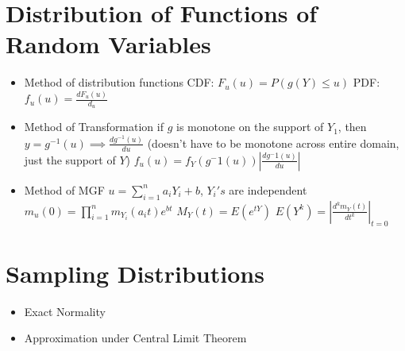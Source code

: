 \documentclass{report}
\begin{document}
\section{Distribution of Functions of Random Variables}
\begin{itemize}
	\item Method of distribution functions 
	\subitem CDF: $F_u(u) = P(g(Y) \leq u)$
	\subitem PDF: $f_u(u) = \frac{dF_u(u)}{d_u}$
	\item Method of Transformation
	\subitem if $g$ is monotone on the support of $Y_1$, then $y = g^{-1}(u) \implies \frac{dg^{-1}(u)}{du}$ (doesn't have to be monotone across entire domain, just the support of $Y$)
	\subitem $f_u(u) = f_Y(g^-1(u))|\frac{dg^-1(u)}{du}|$
	\item Method of MGF
	\subitem $u = \sum_{i=1}^{n}a_iY_i + b$, $Y_i's$ are independent
	\subitem $m_u(0) = \prod_{i=1}^{n}m_{Y_{i}}(a_{i}t)e^{bt}$
	\subitem $M_Y(t) =E(e^{tY})$
	\subitem $E(Y^k) = |\frac{d^km_Y(t)}{dt^k}|_{t=0}$
\end{itemize}
\section{Sampling Distributions}
\begin{itemize}
	\item Exact Normality
	\item Approximation under Central Limit Theorem
\end{itemize}




	

\end{document}
